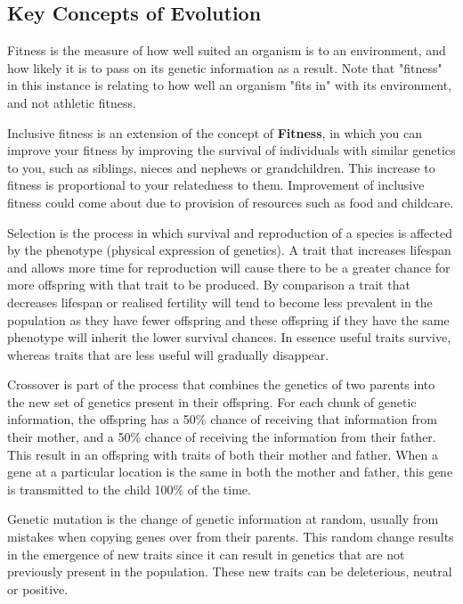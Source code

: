 \documentclass[authoryearcitations]{UoYCSproject}
\begin{document}
\subsection{Key Concepts of Evolution}
\begin{description}[style=nextline]

\item [Fitness] Fitness is the measure of how well suited an organism is to an environment, and how likely it is to pass on its genetic information as a result. Note that "fitness" in this instance is relating to how well an organism "fits in" with its environment, and not athletic fitness.

\item [Inclusive Fitness] Inclusive fitness is an extension of the concept of \textbf{Fitness}, in which you can improve your fitness by improving the survival of individuals with similar genetics to you, such as siblings, nieces and nephews or grandchildren. This increase to fitness is proportional to your relatedness to them. Improvement of inclusive fitness could come about due to provision of resources such as food and childcare.

\item[Selection] Selection is the process in which survival and reproduction of a species is affected by the phenotype (physical expression of genetics). A trait that increases lifespan and allows more time for reproduction will cause there to be a greater chance for more offspring with that trait to be produced. By comparison a trait that decreases lifespan or realised fertility will tend to become less prevalent in the population as they have fewer offspring and these offspring if they have the same phenotype will inherit the lower survival chances. In essence useful traits survive, whereas traits that are less useful will gradually disappear.

\item [Crossover] Crossover is part of the process that combines the genetics of two parents into the new set of genetics present in their offspring. For each chunk of genetic information, the offspring has a 50\% chance of receiving that information from their mother, and a 50\% chance of receiving the information from their father. This result in an offspring with traits of both their mother and father. When a gene at a particular location is the same in both the mother and father, this gene is transmitted to the child 100\% of the time. 

\item [Mutation] Genetic mutation is the change of genetic information at random, usually from mistakes when copying genes over from their parents. This random change results in the emergence of new traits since it can result in genetics that are not previously present in the population. These new traits can be deleterious, neutral or positive.


\end{description}
\end{document}
